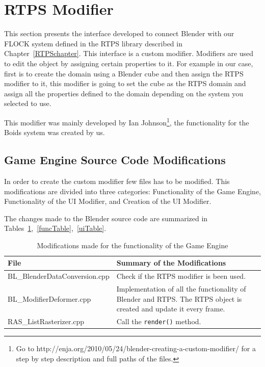 \section{RTPS Modifier}\label{modifiersection}
This section presents the interface developed to connect Blender with our FLOCK system defined in the RTPS library described in Chapter~\ref{RTPSchapter}. This interface is a custom modifier. Modifiers are used to edit the object by assigning certain properties to it. For example in our case, first is to create the domain using a Blender cube and then assign the RTPS modifier to it, this modifier is going to set the cube as the RTPS domain and assign all the properties defined to the domain depending on the system you selected to use.

This modifier was mainly developed by Ian Johnson\footnote{Go to http://enja.org/2010/05/24/blender-creating-a-custom-modifier/ for a step by step description and full paths of the files.}, the functionality for the Boids system was created by us. 

\subsection{Game Engine Source Code Modifications}
In order to create the custom modifier few files has to be modified. This modifications are divided into three categories: Functionality of the Game Engine, Functionality of the UI Modifier, and  Creation of the UI Modifier.

The changes made to the Blender source code are summarized in Tables~\ref{geTable},~\ref{funcTable},~\ref{uiTable}.


\begin{table}[htdp]
\caption{Modifications made for the functionality of the Game Engine}
\begin{center}
\begin{tabular}{|p{6cm}|p{6cm}|}
\hline 
\textbf{File} & \textbf{Summary of the Modifications} \\\hline 
BL\_BlenderDataConversion.cpp & Check if the RTPS modifier is been used. \\\hline 
BL\_ModifierDeformer.cpp & Implementation of all the functionality of Blender and RTPS. The RTPS object is created and update it every frame. \\\hline 
RAS\_ListRasterizer.cpp & Call the \texttt{render()} method. \\
\hline 
\end{tabular} 
\end{center}
\label{geTable}
\end{table}

